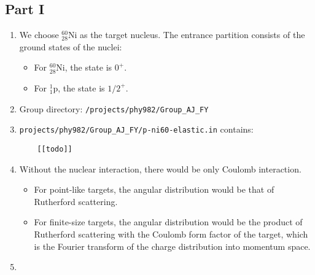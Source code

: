 \documentclass[fleqn, 12pt]{article}
\begin{document}
\subsection*{Part I}

\begin{enumerate}

\item We choose ${}^{60}_{28} \mathrm{Ni}$ as the target nucleus.  The entrance
  partition consists of the ground states of the nuclei:
  \begin{itemize}
  \item For ${}^{60}_{28} \mathrm{Ni}$, the state is $0^+$.
  \item For ${}^{1}_{1} \mathrm{p}$, the state is $1/2^+$.
  \end{itemize}

\item Group directory: \verb|/projects/phy982/Group_AJ_FY|

\item \verb|projects/phy982/Group_AJ_FY/p-ni60-elastic.in| contains:

  \begin{lstlisting}
    [[todo]]
  \end{lstlisting}

\item Without the nuclear interaction, there would be only Coulomb
  interaction.

  \begin{itemize}
  \item For point-like targets, the angular distribution would be
    that of Rutherford scattering.
  \item For finite-size targets, the angular distribution would be the product
    of Rutherford scattering with the Coulomb form factor of the target, which
    is the Fourier transform of the charge distribution into momentum space.
  \end{itemize}

\item

\end{enumerate}
\end{document}
